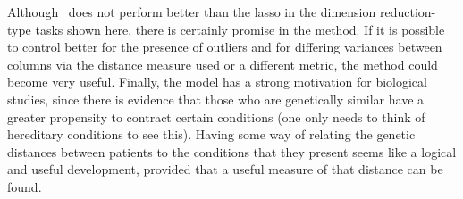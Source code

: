 Although \mdsds\ does not perform better than the lasso in the dimension reduction-type tasks shown here, there is certainly promise in the method. If it is possible to control better for the presence of outliers and for differing variances between columns via the distance measure used or a different metric, the method could become very useful. Finally, the model has a strong motivation for biological studies, since there is evidence that those who are genetically similar have a greater propensity to contract certain conditions (one only needs to think of hereditary conditions to see this). Having some way of relating the genetic distances between patients to the conditions that they present seems like a logical and useful development, provided that a useful measure of that distance can be found.
